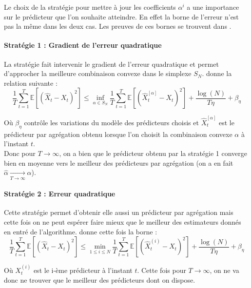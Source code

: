 \documentclass{report}
\begin{document}
Le choix de la stratégie pour mettre à jour les coefficients $\alpha^{i}$ a une importance sur le prédicteur que l'on souhaite atteindre. En effet la borne de l'erreur n'est pas la même dans les deux cas. Les preuves de ces bornes se trouvent dans \citep{giraud-roueff-sanchez-aos2015}.\\
\paragraph{Stratégie 1 : Gradient de l'erreur quadratique}
La stratégie fait intervenir le gradient de l'erreur quadratique et permet d'approcher la meilleure combinaison convexe dans le simplexe $S_N$. \citep{giraud-roueff-sanchez-aos2015} donne la relation suivante :
\begin{equation}
\frac{1}{T} \sum_{t=1}^T \mathbb{E}[(\hat X_t-X_t)^2] \leq \inf_{\alpha \in S_N} \frac{1}{T} \sum_{t=1}^T \mathbb{E}[(\hat X_t^{[\alpha]}-X_t)^2] + \frac{\log(N)}{T \eta} + \beta_{\eta}
\end{equation}

Où $\beta_{\eta}$ contrôle les variations du modèle des prédicteurs choisis et $\hat X_t^{[\alpha]}$ est le prédicteur par agrégation obtenu lorsque l'on choisit la combinaison convexe $\alpha$ à l'instant $t$. \\

Donc pour $T{\longrightarrow}\infty$, on a bien que le prédicteur obtenu par la stratégie 1 converge bien en moyenne vers le meilleur des prédicteurs par agrégation (on a en fait $\hat\alpha\underset{T\longrightarrow\infty}{\longrightarrow}\alpha$).


\paragraph{Stratégie 2 : Erreur quadratique}
Cette stratégie permet d'obtenir elle aussi un prédicteur par agrégation mais cette fois on ne peut espérer faire mieux que le meilleur des estimateurs donnés en entré de l'algorithme. \citep{giraud-roueff-sanchez-aos2015} donne cette fois la borne :
\begin{equation}
\frac{1}{T} \sum_{t=1}^T \mathbb{E}[(\hat X_t-X_t)^2] \leq \min_{1 \leq i \leq N} \frac{1}{T} \sum_{t=1}^T \mathbb{E}[(\hat X_t^{(i)}-X_t)^2] + \frac{\log(N)}{T \eta} + \beta_{\eta}
\end{equation}

Où $X_t^{(i)}$ est le i-ème prédicteur à l'instant $t$.
Cette fois pour $T{\longrightarrow}\infty$, on ne va donc ne trouver que le meilleur des prédicteurs dont on dispose.
\end{document}
